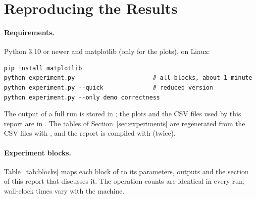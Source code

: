 \section{Reproducing the Results}\label{app:run}

\paragraph{Requirements.} Python 3.10 or newer and matplotlib (only for the plots), on Linux:
\begin{verbatim}
pip install matplotlib
python experiment.py                      # all blocks, about 1 minute
python experiment.py --quick              # reduced version
python experiment.py --only demo correctness
\end{verbatim}
The output of a full run is stored in ; the plots and the CSV files used by this report are in . The tables of Section~\ref{sec:experiments} are regenerated from the CSV files with , and the report is compiled with  (twice).

\paragraph{Experiment blocks.} Table~\ref{tab:blocks} maps each block of  to its parameters, outputs and the section of this report that discusses it. The operation counts are identical in every run; wall-clock times vary with the machine.

